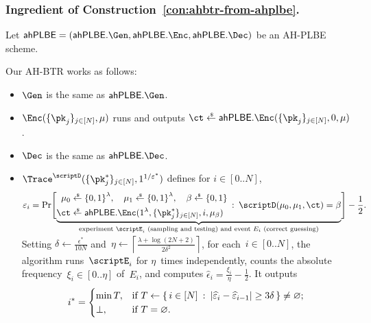 \subsubsection{Ingredient of Construction~\ref{con:ahbtr-from-ahplbe}.}
Let
${\AHPLBE=(\AHPLBE.\Gen},\allowbreak\AHPLBE.\Enc,\allowbreak\AHPLBE.\Dec)$
be an AH-PLBE scheme.

\begin{construction}\label{con:ahbtr-from-ahplbe}
Our AH-BTR works as follows:
\begin{itemize}
\item $\Gen$ is the same as $\AHPLBE.\Gen$.
\item $\Enc(\{\pk_j\}_{j\in[N]},\mu)$ runs and outputs
${\ct\draws\AHPLBE.\Enc(\{\pk_j\}_{j\in[N]},0,\mu)}$.
\item $\Dec$ is the same as $\AHPLBE.\Dec$.
\item $\Trace^\scriptD(\{\pk^\ast_j\}_{j\in[N]},1^{1/\epsilon^\ast})$
defines
for ${i\in[0..N]}$,
\begin{align*}
\WideNarrow{}{\hspace*{-1em}}
\epsilon_i=\Pr\Biggl[\smash{\underbrace{
\begin{aligned}
\mu_0&{}\draws\bit^\lambda,\quad
\mu_1\draws\bit^\lambda,\quad
\beta\draws\bit\\
\ct&{}\draws\AHPLBE.\Enc(1^\lambda,\{\pk^\ast_j\}_{j\in[N]},i,\mu_\beta)
\end{aligned}
\::\:
\scriptD(\mu_0,\mu_1,\ct)=\beta
}_{\textup{experiment }\scriptE_i\textup{ (sampling and testing) and event }E_i\textup{ (correct guessing)}}}
\Biggr]-\frac12.
\vphantom{\underbrace{\begin{aligned}0\\0\end{aligned}}_{0}}
\end{align*}
Setting ${\delta\gets\frac{\epsilon^\ast}{10N}}$
and~${\eta\gets\left\lceil\frac{\lambda+\log({2N+2})}{2\delta^2}\right\rceil}$,
for each~${i\in[0..N]}$,
the algorithm runs~$\scriptE_i$ for $\eta$~times independently,
counts the absolute frequency~${\xi_i\in[0..\eta]}$ of~$E_i$, and
computes ${\widehat{\epsilon}_i=\frac{\xi_i}{\eta}-\frac12}$.
It outputs
\begin{align*}
i^\ast=\begin{cases}
\min T,&\textup{if }T\gets
\{\,
{i\in[N]}
\::\:
{|\widehat{\epsilon}_i-\widehat{\epsilon}_{i-1}|\geq 3\delta}
\,\}
\neq\varnothing;\\
\bot,&\textup{if }T=\varnothing.
\end{cases}
\end{align*}
\end{itemize}
\end{construction}

